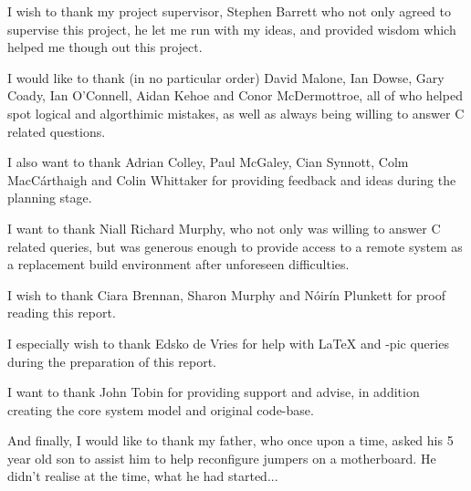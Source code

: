 
I wish to thank my project supervisor, Stephen Barrett who not only
agreed to supervise this project, he let me run with my ideas, and 
provided wisdom which helped me though out this project.

\vspace{5mm}

I would like to thank (in no particular order) David Malone, 
Ian Dowse, Gary Coady, Ian O'Connell, Aidan Kehoe and 
Conor McDermottroe, all of who helped spot logical and algorthimic 
mistakes, as well as always being willing to answer C related 
questions.


I also want to thank Adrian Colley, Paul McGaley, Cian Synnott, Colm
MacC\'{a}rthaigh and Colin Whittaker for providing feedback and ideas 
during the planning stage.


I want to thank Niall Richard Murphy, who not only was willing to answer
C related queries, but was generous enough to provide access to a remote
system as a replacement build environment after unforeseen difficulties.

\vspace{5mm}

I wish to thank Ciara Brennan, Sharon Murphy and N\'{o}ir\'{i}n Plunkett
for proof reading this report. 


I especially wish to thank Edsko de Vries for help with
\textrm{\LaTeX{}}  and \textrm{\Xy-pic} queries during the preparation 
of this report.

\vspace{5mm}

I want to thank John Tobin for providing support and advise, in 
addition creating the core system model and original code-base.

\vspace{5mm}

And finally, I would like to thank my father, who once upon a time, 
asked his 5 year old son to assist him to help reconfigure jumpers on
a motherboard. He didn't realise at the time, what he had started...
